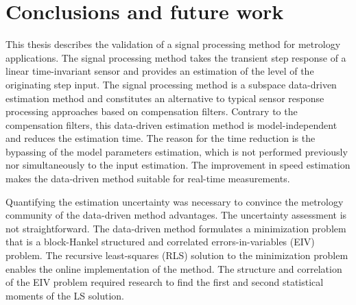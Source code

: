 \glsresetall

\chapter[Conclusions and future work]{Conclusions and \linebreak future work} \label{chap:concl}




This thesis describes the validation of a signal processing method for metrology applications.
The signal processing method takes the transient step response of a linear time-invariant sensor and provides an estimation of the level of the originating step input.
The signal processing method is a subspace data-driven estimation method and constitutes an alternative to typical sensor response processing approaches based on compensation filters.
Contrary to the compensation filters, this data-driven estimation method is model-independent and reduces the estimation time. 
The reason for the time reduction is the bypassing of the model parameters estimation, which is not performed previously nor simultaneously to the input estimation.
The improvement in speed estimation makes the data-driven method suitable for real-time measurements.


Quantifying the estimation uncertainty was necessary to convince the metrology community of the data-driven method advantages.
The uncertainty assessment is not straightforward.
The data-driven method formulates a minimization problem that is a block-Hankel structured and correlated errors-in-variables (EIV) problem.
The recursive least-squares (RLS) solution to the minimization problem enables the online implementation of the method.
The structure and correlation of the EIV problem required research to find the first and second statistical moments of the LS solution.


